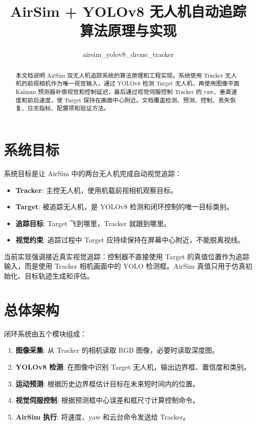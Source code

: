 \documentclass[UTF8,a4paper,11pt]{ctexart}
\title{AirSim + YOLOv8 无人机自动追踪算法原理与实现}
\author{airsim\_yolov8\_drone\_tracker}
\date{}
\begin{document}
\maketitle

\begin{abstract}
本文档说明 AirSim 双无人机追踪系统的算法原理和工程实现。系统使用 Tracker 无人机的前视相机作为唯一视觉输入，通过 YOLOv8 检测 Target 无人机，再使用图像平面 Kalman 预测器补偿视觉和控制延迟，最后通过视觉伺服控制 Tracker 的 yaw、垂直速度和前后速度，使 Target 保持在画面中心附近。文档覆盖检测、预测、控制、丢失恢复、日志指标、配置项和验证方法。
\end{abstract}

\tableofcontents
\newpage

\section{系统目标}

系统目标是让 AirSim 中的两台无人机完成自动视觉追踪：

\begin{itemize}
  \item \textbf{Tracker}: 主控无人机，使用机载前视相机观察目标。
  \item \textbf{Target}: 被追踪无人机，是 YOLOv8 检测和闭环控制的唯一目标类别。
  \item \textbf{追踪目标}: Target 飞到哪里，Tracker 就跟到哪里。
  \item \textbf{视觉约束}: 追踪过程中 Target 应持续保持在屏幕中心附近，不能脱离视线。
\end{itemize}

当前实现强调接近真实视觉追踪：控制器不直接使用 Target 的真值位置作为追踪输入，而是使用 Tracker 相机画面中的 YOLO 检测框。AirSim 真值只用于仿真初始化、目标轨迹生成和评估。

\section{总体架构}

闭环系统由五个模块组成：

\begin{enumerate}
  \item \textbf{图像采集}: 从 Tracker 的相机读取 RGB 图像，必要时读取深度图。
  \item \textbf{YOLOv8 检测}: 在图像中识别 Target 无人机，输出边界框、置信度和类别。
  \item \textbf{运动预测}: 根据历史边界框估计目标在未来短时间内的位置。
  \item \textbf{视觉伺服控制}: 根据预测框中心误差和框尺寸计算控制命令。
  \item \textbf{AirSim 执行}: 将速度、yaw 和云台命令发送给 Tracker。
\end{enumerate}
\end{document}
